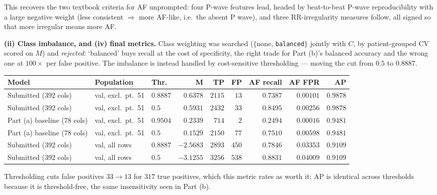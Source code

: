 \documentclass[10pt,a4paper]{article}
\begin{document}
This recovers the two textbook criteria for AF unprompted: four P-wave features
lead, headed by beat-to-beat P-wave reproducibility with a large negative weight
(less consistent $\Rightarrow$ more AF-like, i.e.\ the absent P wave), and three
RR-irregularity measures follow, all signed so that more irregular means more AF.

\textbf{(ii) Class imbalance, and (iv) final metrics.} Class weighting was
searched ($\{$none, \texttt{balanced}$\}$ jointly with $C$, by patient-grouped CV
scored on $M$) and \emph{rejected}: `balanced' buys recall at the cost of
specificity, the right trade for Part (b)'s balanced accuracy and the wrong one
at $100\times$ per false positive. The imbalance is instead handled by
cost-sensitive thresholding --- moving the cut from $0.5$ to $0.8887$.

\begin{table}[h]
\centering\footnotesize
\begin{tabular}{@{}lllrrrrrr@{}}
\toprule
\textbf{Model} & \textbf{Population} & \textbf{Thr.} & \textbf{M} & \textbf{TP}
& \textbf{FP} & \textbf{AF recall} & \textbf{AF FPR} & \textbf{AP} \\
\midrule
Submitted (392 cols)      & val, excl.\ pt.\ 51 & $0.8887$ & $\mathbf{0.6378}$ & $2115$ & $13$ & $0.7387$ & $0.00101$ & $0.9878$ \\
Submitted (392 cols)      & val, excl.\ pt.\ 51 & $0.5$    & $0.5931$ & $2432$ & $33$ & $0.8495$ & $0.00256$ & $0.9878$ \\
Part (a) baseline (78 cols) & val, excl.\ pt.\ 51 & $0.9504$ & $0.2339$ & $714$ & $2$ & $0.2494$ & $0.00016$ & $0.9481$ \\
Part (a) baseline (78 cols) & val, excl.\ pt.\ 51 & $0.5$    & $0.1529$ & $2150$ & $77$ & $0.7510$ & $0.00598$ & $0.9481$ \\
Submitted (392 cols)      & val, all rows       & $0.8887$ & $-2.5683$ & $2893$ & $450$ & $0.7846$ & $0.03353$ & $0.9109$ \\
Submitted (392 cols)      & val, all rows       & $0.5$    & $-3.1255$ & $3256$ & $538$ & $0.8831$ & $0.04009$ & $0.9109$ \\
\bottomrule
\end{tabular}
\end{table}

Thresholding cuts false positives $33 \to 13$ for $317$ true positives, which
this metric rates as worth it; AP is identical across thresholds because it is
threshold-free, the same insensitivity seen in Part (b).
\end{document}
